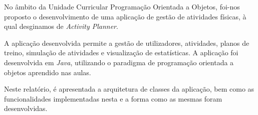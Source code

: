 \documentclass[a4paper,12pt]{scrreprt}
\begin{document}



\makecover



\renewenvironment{abstract}
 {\par\noindent\textbf{\Large\abstractname}\par\bigskip}
 {}

\begin{flushleft}
\begin{abstract}
    No âmbito da Unidade Curricular Programação Orientada a Objetos, foi-nos proposto o
    desenvolvimento de uma aplicação de gestão de atividades físicas, à qual desginamos de \textit{Activity Planner}.

    A aplicação desenvolvida permite a gestão de utilizadores, atividades, planos de treino, simulação de atividades e
    visualização de estatísticas. A aplicação foi desenvolvida em \textit{Java}, utilizando o paradigma de programação
    orientada a objetos aprendido nas aulas.

    Neste relatório, é apresentada a arquitetura de classes da aplicação, bem
    como as funcionalidades implementadas nesta e a forma como as mesmas foram desenvolvidas.
\end{abstract}
\end{flushleft}



\renewcommand{\contentsname}{Índice}
\renewcommand{\listfigurename}{Índice de Figuras}
\end{document}

